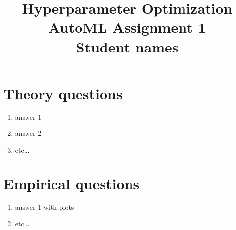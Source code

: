 \documentclass[12pt]{article}
\title{Hyperparameter Optimization \\ \large AutoML Assignment 1 \\ \small Student names}
\date{}
\author{}
\begin{document}
\maketitle

\vspace{-2.8cm}


\section{Theory questions}

\begin{enumerate}
    \item answer 1
    \item answer 2
    \item etc... 
\end{enumerate}



\section{Empirical questions}

\begin{enumerate}
    \item answer 1 with plots
    \item etc...
\end{enumerate}
    



\end{document}
